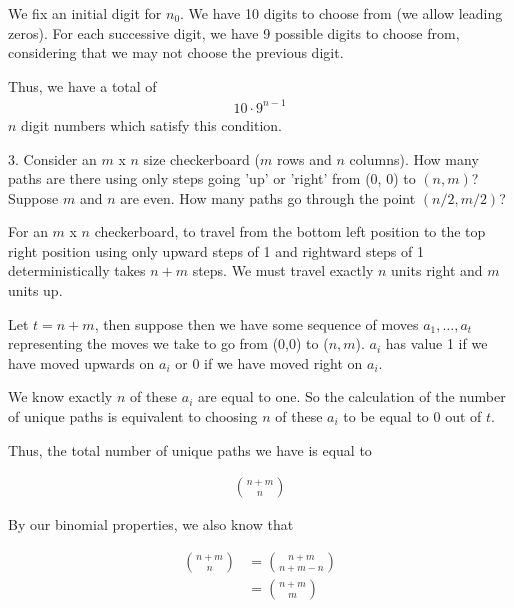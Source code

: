\documentclass{article}
\begin{document}
We fix an initial digit for $n_0$. We have 10 digits to choose from (we allow leading zeros). 
For each successive digit, we have 9 possible digits to choose from, considering that we may not choose
the previous digit.

\vspace{5mm}

Thus, we have a total of 
\begin{align*}
10 \cdot 9^{n-1}
\end{align*}
$n$ digit numbers which satisfy this condition.

\vspace{5mm}

3. Consider an $m$ x $n$ size checkerboard ($m$ rows and $n$ columns). How many paths are
there using only steps going ’up’ or ’right’ from (0, 0) to $(n, m)$? Suppose $m$ and $n$ are
even. How many paths go through the point $(n/2, m/2)$?
\vspace{5mm}

For an $m$ x $n$ checkerboard, to travel from the bottom left position to the top right position
using only upward steps of 1 and rightward steps of 1 deterministically takes $n+m$ steps. We must
travel exactly $n$ units right and $m$ units up. 

\vspace{5mm}

Let $t = n+m$, then suppose then we have some sequence of moves $a_1, \ldots, a_t$ 
representing the moves we take to go from (0,0) to ($n, m$). $a_i$ has value 1 if we have moved
upwards on $a_i$ or 0 if we have moved right on $a_i$.

\vspace{5mm}

We know exactly $n$ of these $a_i$ are equal to
one. So the calculation of the number of unique paths is equivalent to choosing $n$ of these
$a_i$ to be equal to 0 out of $t$.

\vspace{5mm}

Thus, the total number of unique paths we have is equal to

\begin{align*}
    \binom{n+m}{n}
\end{align*}

By our binomial properties, we also know that

\begin{align*}
    \binom{n+m}{n} &= \binom{n+m}{n+m - n}\\
                       &= \binom{n+m}{m}
\end{align*}
\end{document}
